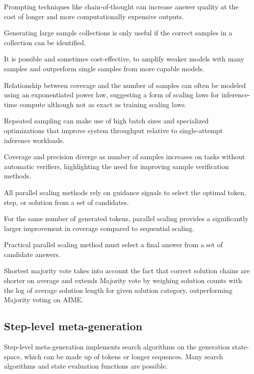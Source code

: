 Prompting techniques like chain-of-thought can increase answer quality at the cost of longer and more computationally expensive outputs. \cite{brown2024largelanguagemonkeysscaling}

Generating large sample collections is only useful if the correct samples in a collection can be identified. \cite{brown2024largelanguagemonkeysscaling}

It is possible and sometimes cost-effective, to amplify weaker models with many samples and outperform single samples from more capable models. \cite{brown2024largelanguagemonkeysscaling}

Relationship between coverage and the number of samples can often be modeled using an exponentiated power law, suggesting a form of scaling laws for inference-time compute although not as exact as training scaling laws. \cite{brown2024largelanguagemonkeysscaling}

Repeated sampling can make use of high batch sizes and specialized optimizations that improve system throughput relative to single-attempt inference workloads. \cite{brown2024largelanguagemonkeysscaling}

Coverage and precision diverge as number of samples increases on tasks without automatic verifiers, highlighting the need for improving sample verification methods. \cite{brown2024largelanguagemonkeysscaling}


All parallel scaling methods rely on guidance signals to select the optimal token, step, or solution from a set of candidates. \cite{zeng2025revisitingtesttimescalingo1like}

For the same number of generated tokens, parallel scaling provides a significantly larger improvement in coverage compared to sequential scaling. \cite{zeng2025revisitingtesttimescalingo1like}

Practical parallel scaling method must select a final answer from a set of candidate answers. \cite{zeng2025revisitingtesttimescalingo1like}

Shortest majority vote takes into account the fact that correct solution chains are shorter on average and extends Majority vote by weighing solution counts with the log of average solution length for given solution category, outperforming Majority voting on AIME. \cite{zeng2025revisitingtesttimescalingo1like}

\subsection{Step-level meta-generation}
Step-level meta-generation implements search algorithms on the generation state-space, which can be made up of tokens or longer sequences. Many search algorithms and state evaluation functions are possible. \cite{welleck2024decodingmetagenerationinferencetimealgorithms}


